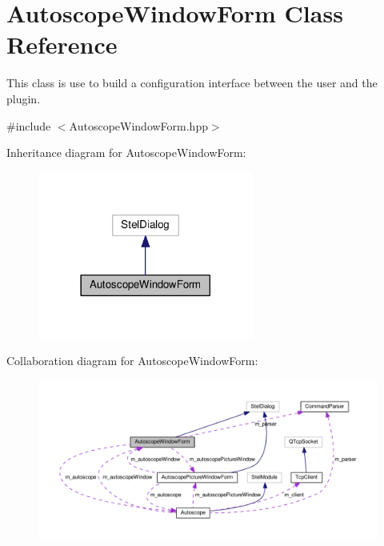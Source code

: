 \hypertarget{class_autoscope_window_form}{}\section{Autoscope\+Window\+Form Class Reference}
\label{class_autoscope_window_form}


This class is use to build a configuration interface between the user and the plugin.  




{\ttfamily \#include $<$Autoscope\+Window\+Form.\+hpp$>$}



Inheritance diagram for Autoscope\+Window\+Form\+:
\nopagebreak
\begin{figure}[H]
\begin{center}
\leavevmode
\includegraphics[width=201pt]{class_autoscope_window_form__inherit__graph}
\end{center}
\end{figure}


Collaboration diagram for Autoscope\+Window\+Form\+:
\nopagebreak
\begin{figure}[H]
\begin{center}
\leavevmode
\includegraphics[width=350pt]{class_autoscope_window_form__coll__graph}
\end{center}
\end{figure}

